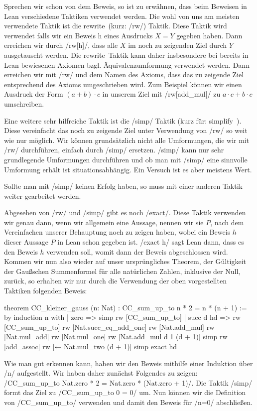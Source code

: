 \documentclass[10pt]{article}
\begin{document}
\noindent Sprechen wir schon von dem Beweis, so ist zu erwähnen, dass beim Beweisen in Lean verschiedene Taktiken verwendet werden. Die wohl von uns am meisten verwendete Taktik ist die \glqq rewrite\grqq~(kurz: \lean/rw/) Taktik. Diese Taktik wird verwendet falls wir ein Beweis h eines Ausdrucks $X=Y$ gegeben haben. Dann erreichen wir durch \lean/rw[h]/, dass alle $X$ im noch zu zeigenden Ziel durch $Y$ ausgetauscht werden. Die \glqq rewrite\grqq~Taktik kann daher insbesondere bei bereits in Lean bewiesenen Axiomen bzgl. Äquivalenzumformung verwendet werden. Dann erreichen wir mit \lean/rw/ und dem Namen des Axioms, dass das zu zeigende Ziel entsprechend des Axioms umgeschrieben wird. Zum Beispiel können wir einen Ausdruck der Form $(a+b)\cdot c$ in unserem Ziel mit \lean/rw[add_mul]/ zu $a\cdot c+b\cdot c$ umschreiben.

\noindent Eine weitere sehr hilfreiche Taktik ist die \lean/simp/ Taktik (kurz für: \glqq simplify\grqq~). Diese vereinfacht das noch zu zeigende Ziel unter Verwendung von \lean/rw/ so weit wie nur möglich. Wir können grundsätzlich nicht alle Umformungen, die wir mit \lean/rw/ durchführen, einfach durch \lean/simp/ ersetzen. \lean/simp/ kann nur sehr grundlegende Umformungen durchführen und ob man mit \lean/simp/ eine sinnvolle Umformung erhält ist situationsabhängig. Ein Versuch ist es aber meistens Wert.\par
\noindent Sollte man mit \lean/simp/ keinen Erfolg haben, so muss mit einer anderen Taktik weiter gearbeitet werden.

\noindent Abgesehen von \lean/rw/ und \lean/simp/ gibt es noch \lean/exact/. Diese Taktik verwenden wir genau dann, wenn wir allgemein eine Aussage, nennen wir sie $P$, nach dem Vereinfachen unserer Behauptung noch zu zeigen haben, wobei ein Beweis $h$ dieser Aussage $P$ in Lean schon gegeben ist. \lean/exact h/ sagt Lean dann, dass es den Beweis $h$ verwenden soll, womit dann der Beweis abgeschlossen wird.\\

\noindent Kommen wir nun also wieder auf unser ursprüngliches Theorem, der Gültigkeit der Gaußschen Summenformel für alle natürlichen Zahlen, inklusive der Null, zurück, so erhalten wir nur durch die Verwendung der oben vorgestellten Taktiken folgenden Beweis:
\begin{leancode}
theorem CC_kleiner_gauss (n: Nat) : CC_sum_up_to n * 2 = n * (n + 1) := by
  induction n with
    | zero => 
    simp
    rw [CC_sum_up_to]
    | succ d hd => 
    rw [CC_sum_up_to]
    rw [Nat.succ_eq_add_one]
    rw [Nat.add_mul]
    rw [Nat.mul_add]
    rw [Nat.mul_one]
    rw [Nat.add_mul d 1 (d + 1)]
    simp
    rw [add_assoc]
    rw [← Nat.mul_two (d + 1)]
    simp
    exact hd
\end{leancode}
\noindent Wie man gut erkennen kann, haben wir den Beweis mithilfe einer Induktion über \lean/n/ aufgestellt. Wir haben daher zunächst Folgendes zu zeigen: \lean/CC_sum_up_to Nat.zero * 2 = Nat.zero * (Nat.zero + 1)/. Die Taktik \lean/simp/ formt das Ziel zu \lean/CC_sum_up_to 0 = 0/ um. Nun können wir die Definition von \lean/CC_sum_up_to/ verwenden und damit den Beweis für \lean/n=0/ abschließen.
\end{document}
